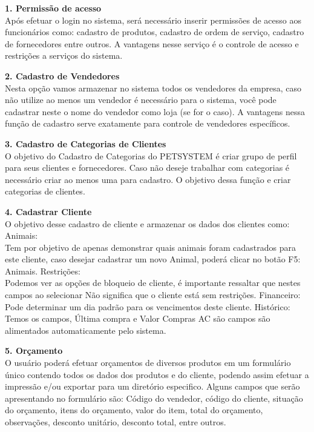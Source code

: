 \documentclass[12pt,openright,twoside,a4paper,english,french,spanish,brazil]{abntex2}
\begin{document}
\textbf{1.	{Permissão de acesso}}\\
Após efetuar o login no sistema, será necessário inserir permissões de acesso aos funcionários como: cadastro de produtos, cadastro de ordem de serviço, cadastro de fornecedores entre outros. A vantagens nesse serviço é o controle de acesso e restrições a serviços do sistema.

\textbf{2.	{Cadastro de Vendedores}}\\
Nesta opção vamos armazenar no sistema todos os vendedores da empresa, caso não utilize ao menos um vendedor é necessário para o sistema, você pode cadastrar neste o nome do vendedor como loja (se for o caso). A vantagens nessa função de cadastro serve exatamente para controle de vendedores específicos.

\textbf{3.	{Cadastro de Categorias de Clientes}}\\
O objetivo do Cadastro de Categorias do PETSYSTEM é criar grupo de perfil para seus clientes e fornecedores. Caso não deseje trabalhar com categorias é necessário criar ao menos uma para cadastro. O objetivo dessa função e criar categorias de clientes.

\textbf{4.	{Cadastrar Cliente}}\\
O objetivo desse cadastro de cliente e armazenar os dados dos clientes como:
Animais:\\ 
Tem por objetivo de apenas demonstrar quais animais foram cadastrados para este cliente, caso desejar cadastrar um novo Animal, poderá clicar no botão F5: Animais.
Restrições:\\ 
Podemos ver as opções de bloqueio de cliente, é importante ressaltar que nestes campos ao selecionar Não significa que o cliente está sem restrições.
Financeiro:\\ 
Pode determinar um dia padrão para os vencimentos deste cliente.
Histórico:\\ 
Temos os campos, Última compra e Valor Compras AC são campos são alimentados automaticamente pelo sistema.

\textbf{5.	{Orçamento}}\\
O usuário poderá efetuar orçamentos de diversos produtos em um formulário único contendo todos os dados dos produtos e do cliente, podendo assim efetuar a impressão e/ou exportar para um diretório especifico.
Alguns campos que serão apresentando no formulário são: Código do vendedor, código do cliente, situação do orçamento, itens do orçamento, valor do item, total do orçamento, observações, desconto unitário, desconto total, entre outros.
\end{document}
